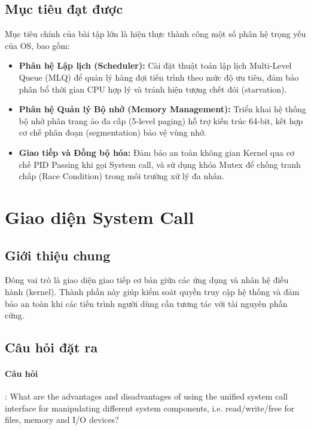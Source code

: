 \documentclass[a4paper]{article}
\begin{document}
\subsection{Mục tiêu đạt được}
Mục tiêu chính của bài tập lớn là hiện thực thành công một số phân hệ trọng yếu của OS, bao gồm:
\begin{itemize}
    \item \textbf{Phân hệ Lập lịch (Scheduler):} Cài đặt thuật toán lập lịch Multi-Level Queue (MLQ) để quản lý hàng đợi tiến trình theo mức độ ưu tiên, đảm bảo phân bổ thời gian CPU hợp lý và tránh hiện tượng chết đói (starvation).
    \item \textbf{Phân hệ Quản lý Bộ nhớ (Memory Management):} Triển khai hệ thống bộ nhớ phân trang ảo đa cấp (5-level paging) hỗ trợ kiến trúc 64-bit, kết hợp cơ chế phân đoạn (segmentation) bảo vệ vùng nhớ.
    \item \textbf{Giao tiếp và Đồng bộ hóa:} Đảm bảo an toàn không gian Kernel qua cơ chế PID Passing khi gọi System call, và sử dụng khóa Mutex để chống tranh chấp (Race Condition) trong môi trường xử lý đa nhân.
\end{itemize}


\pagebreak

\section{Giao diện System Call}

\subsection{Giới thiệu chung}
Đóng vai trò là giao diện giao tiếp cơ bản giữa các ứng dụng và nhân hệ điều hành (kernel). Thành phần này giúp kiểm soát quyền truy cập hệ thống và đảm bảo an toàn khi các tiến trình người dùng cần tương tác với tài nguyên phần cứng.

\subsection{Câu hỏi đặt ra}
\paragraph{Câu hỏi}: What are the advantages and disadvantages of using the unified system call interface for manipulating different system components, i.e. read/write/free for files, memory and I/O devices?
\end{document}
